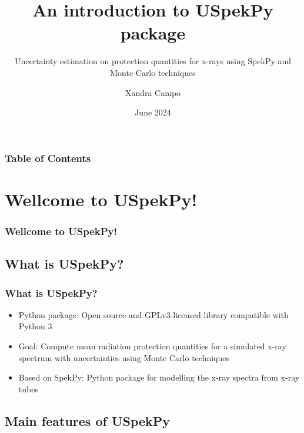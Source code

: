 \documentclass{beamer}
\title{An introduction to USpekPy package}
\subtitle{Uncertainty estimation on protection quantities for x-rays using SpekPy and Monte Carlo techniques}
\author[X. Campo]{Xandra Campo}
\institute[LMRI-CIEMAT]{Ionizing Radiation Metrology Laboratory (LMRI) \newline CIEMAT, Spain}
\date{June 2024}
\newcommand{\highlight}[1]{{\color{blue} #1}}
\begin{document}
	
	\maketitle
	
	\begin{frame}
		\frametitle{Table of Contents}
		\tableofcontents[hideallsubsections]
		\centering
		\href{https://forms.gle/uCHj4XH5BJTBqjiQ9}{}
	\end{frame}
	
	
	\section{Wellcome to USpekPy!}
	
	\begin{frame}
		\frametitle{Wellcome to USpekPy!}
		\tableofcontents[
		currentsection,
		sectionstyle=show/shaded,
		subsectionstyle=show/show/hide
		]
	\end{frame}
	
	\subsection{What is USpekPy?}
	
	\begin{frame}
		\frametitle{What is USpekPy?}
		\begin{itemize}
			\setlength\itemsep{1em}
			\item \highlight{Python package}: Open source and GPLv3-licensed library compatible with Python 3
			\href{https://github.com/lmri-met/uspekpy}{\beamergotobutton{Go}}
			\item \highlight{Goal}: Compute mean radiation protection quantities for a simulated x-ray spectrum with uncertainties using Monte Carlo techniques
			\item Based on \highlight{SpekPy}: Python package for modelling the x-ray spectra from x-ray tubes
			\href{https://bitbucket.org/spekpy/spekpy_release/wiki/Home}{\beamergotobutton{Go}}
		\end{itemize}		
	\end{frame}
	
	\subsection{Main features of USpekPy}
	
\end{document}
